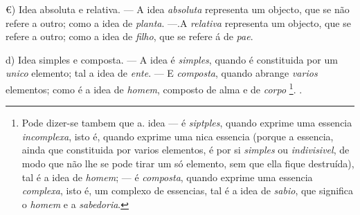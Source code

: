 €) Idea absoluta e relativa. --- A idea \emph{absoluta} representa um objecto, que se não refere a outro; como a idea de \emph{planta}. ---.A \emph{relativa} representa um objecto, que se refere a outro; como a idea de \emph{filho}, que se refere á de \emph{pae}.

d) Idea simples e composta. --- A idea é \emph{simples}, quando é constituida por um \emph{unico} elemento; tal a idea de \emph{ente}. --- E   \emph{composta}, quando abrange \emph{varios} elementos; como é a idea de \emph{homem}, composto de alma e de \emph{corpo} \footnote{Pode dizer-se tambem que a. idea --- é \emph{siptples}, quando exprime uma essencia \emph{incomplexa}, isto é, quando exprime uma nica essencia (porque a essencia, ainda que constituida por varios elementos, é por si \emph{simples} ou \emph{indivisivel}, de modo que não lhe se pode tirar um só elemento, sem que ella fique destruída), tal é a idea de \emph{homem}; --- é \emph{composta}, quando exprime uma essencia \emph{complexa}, isto é, um complexo de essencias, tal é a idea de \emph{sabio}, que significa o \emph{homem} e a \emph{sabedoria}.}. . \textbar{}

